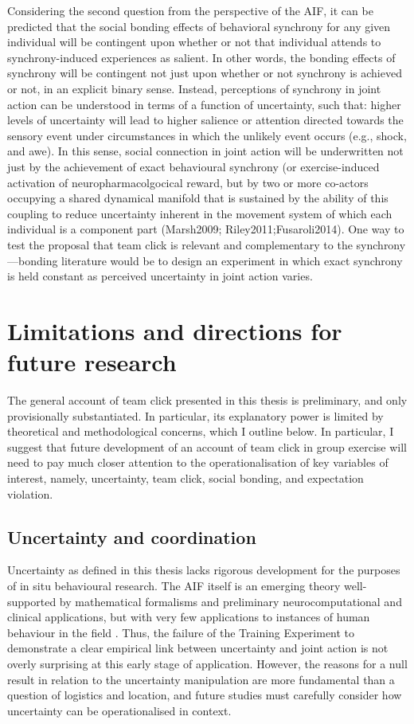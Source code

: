 Considering the second question from the perspective of the AIF,  it can be predicted that the social bonding effects of behavioral synchrony for any given individual will be contingent upon whether or not that individual attends to synchrony-induced experiences as salient.  In other words, the bonding effects of synchrony will be contingent not just upon whether or not synchrony is achieved or not, in an explicit binary sense.  Instead, perceptions of synchrony in joint action can be understood in terms of a function of uncertainty, such that: higher levels of uncertainty will lead to higher salience or attention directed towards the sensory event under circumstances in which the unlikely event occurs (e.g., shock, and awe).  In this sense, social connection in joint action will be underwritten not just by the achievement of exact behavioural synchrony (or exercise-induced activation of neuropharmacolgocical reward, but by two or more co-actors occupying a shared dynamical manifold  that is sustained by the ability of this coupling to reduce uncertainty inherent in the movement system of which each individual is a component part (Marsh2009; Riley2011;Fusaroli2014).  One way to test the proposal that team click is relevant and complementary to the synchrony—bonding literature would be to design an experiment in which exact synchrony is held constant as perceived uncertainty in joint action varies.



\section{Limitations and directions for future research}
The general account of team click presented in this thesis is preliminary, and only provisionally substantiated. In particular, its explanatory power is limited by theoretical and methodological concerns, which I outline below.  In particular, I suggest that future development of an account of team click in group exercise will need to pay much closer attention to the operationalisation of key variables of interest, namely, uncertainty, team click, social bonding, and expectation violation.

\subsection{Uncertainty and coordination}
Uncertainty as defined in this thesis lacks rigorous development for the purposes of in situ behavioural research.  The AIF itself is an emerging theory well-supported by mathematical formalisms and preliminary neurocomputational and clinical applications, but with very few applications to instances of human behaviour in the field \citep{Clark2013}.  Thus, the failure of the Training Experiment to demonstrate a clear empirical link between uncertainty and joint action is not overly surprising at this early stage of application.  However, the reasons for a null result in relation to the uncertainty manipulation are more fundamental than a question of logistics and location, and future studies must carefully consider how uncertainty can be operationalised in context.

